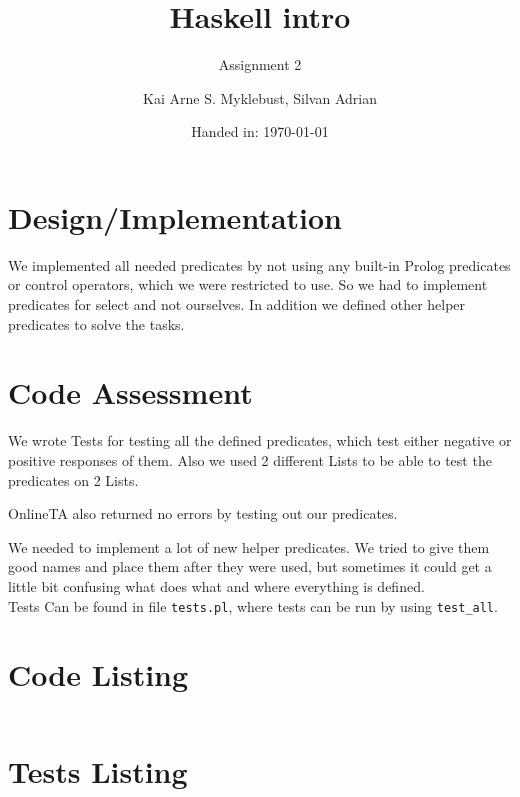 \documentclass[12pt,a4paper]{article}
\begin{document}
\title{Haskell intro}
\subtitle{Assignment 2}

\author{Kai Arne S. Myklebust, Silvan Adrian}
\date{Handed in: \today}
	
\maketitle
\tableofcontents

\section{Design/Implementation}

We implemented all needed predicates by not using any built-in Prolog predicates or control operators, which we were restricted to use.
So we had to implement predicates for select and not ourselves. In addition we defined other helper predicates to solve the tasks.

\section{Code Assessment}
We wrote Tests for testing all the defined predicates, which test either negative or positive responses of them.
Also we used 2 different Lists to be able to test the predicates on 2 Lists.

OnlineTA also returned no errors by testing out our predicates.

We needed to implement a lot of new helper predicates. We tried to give them good names and place them after they were used, but sometimes it could get a little bit confusing what does what and where everything is defined.\\

Tests Can be found in file \texttt{tests.pl}, where tests can be run by using \texttt{test\_all}.

\appendix
\section{Code Listing}
\inputminted{prolog}{handin/twitbook.pl}

\section{Tests Listing}
\inputminted{prolog}{handin/tests.pl}
\end{document}
